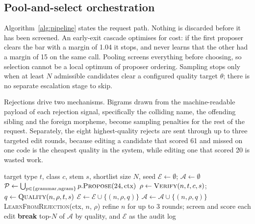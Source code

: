 \documentclass[conference]{IEEEtran}
\begin{document}
\subsection{Pool-and-select orchestration}
\label{sec:orch}

Algorithm~\ref{alg:pipeline} states the request path. Nothing is discarded
before it has been screened. An early-exit cascade optimises for cost: if the
first proposer clears the bar with a margin of 1.04 it stops, and never learns
that the other had a margin of 15 on the same call. Pooling screens everything
before choosing, so selection cannot be a local optimum of proposer ordering.
Sampling stops only when at least $N$ admissible candidates clear a configured
quality target $\theta$; there is no separate escalation stage to skip.

Rejections drive two mechanisms. Bigrams drawn from the machine-readable payload
of each rejection signal, specifically the colliding name, the offending sibling
and the foreign morpheme, become sampling penalties for the rest of the request.
Separately, the eight highest-quality rejects are sent through up to three
targeted edit rounds, because editing a candidate that scored 61 and missed on
one code is the cheapest quality in the system, while editing one that scored 20
is wasted work.

\begin{algorithm}[t]
\caption{Generative--verifier pool-and-select generation}
\label{alg:pipeline}
\begin{algorithmic}[1]
\footnotesize
\Require target type $t$, class $c$, stem $s$, shortlist size $N$, seed
\State $\mathcal{E} \gets \emptyset$;\; $\mathcal{A} \gets \emptyset$
  \State $\mathcal{P} \gets \bigcup_{p \in \{\text{grammar},\text{ngram}\}} p.\textsc{Propose}(24, \text{ctx})$
    \State $\rho \gets \textsc{Verify}(n, t, c, s)$;\; $q \gets \textsc{Quality}(n, \rho, t, s)$
    \State $\mathcal{E} \gets \mathcal{E} \cup \{(n,\rho,q)\}$
     $\mathcal{A} \gets \mathcal{A} \cup \{(n,\rho,q)\}$
    \Else{} \textsc{LearnFromRejection}(ctx, $n$, $\rho$) \EndIf
  \EndFor
    \State refine $n$ for up to 3 rounds; screen and score each edit
  \EndFor
   \textbf{break} \EndIf
\EndFor
\State \Return top-$N$ of $\mathcal{A}$ by quality, and $\mathcal{E}$ as the audit log
\end{algorithmic}
\end{algorithm}
\end{document}
